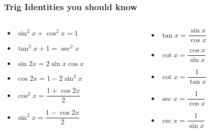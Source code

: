 \documentclass[14pt]{beamer}
\begin{document}
\begin{frame}

\frametitle{Trig Identities you should know}
\small
\begin{columns}[T]

\begin{column}{.5\textwidth}

\begin{block}

\begin{itemize}
\item[]$\sin^2 x + \cos^2 x = 1$ \vspace{0.2cm}
\item[]$\tan^2 x + 1 = \sec^2 x$ \vspace{0.2cm}
\item[]$\sin 2x =2\sin x \cos x$ \vspace{0.2cm}
\item[]$\cos 2x = 1-2\sin^2 x$ \vspace{0.2cm}
\item[]$\cos^2 x = \dfrac{1+\cos 2x}{2}$ \vspace{0.1cm}
\item[]$\sin^2 x = \dfrac{1-\cos 2x}{2}$ \vspace{0.2cm}

\end{itemize}

\end{block}

\end{column}

\begin{column}{.5\textwidth}

\begin{block}

\begin{itemize}

\item[] $\tan x = \dfrac{\sin x}{\cos x}$ \vspace{0.2cm}
\item[] $\cot x = \dfrac{\cos x}{\sin x}$ \vspace{0.2cm}
\item[] $\cot x = \dfrac{1}{\tan x}$ \vspace{0.2cm}
\item[] $\sec x = \dfrac{1}{\cos x}$ \vspace{0.1cm}
\item[] $\csc x = \dfrac{1}{\sin x}$ \vspace{0.2cm}

\end{itemize}

\end{block}

\end{column}

\end{columns}

\end{frame}
\end{document}
